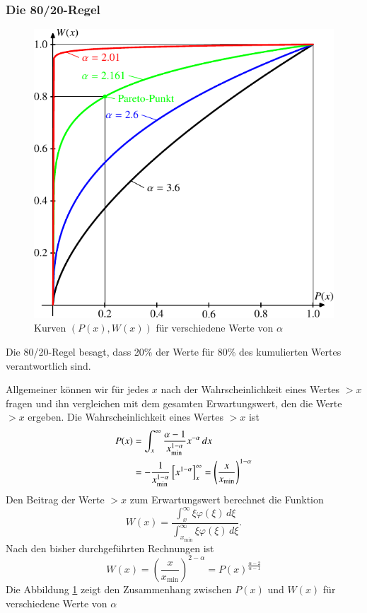 \subsubsection{Die 80/20-Regel}
\begin{figure}
\begin{center}
\includegraphics{images/power-4.pdf}
\end{center}
\caption{Kurven $(P(x),W(x))$ für verschiedene Werte von $\alpha$\label{wp}}
\end{figure}
Die 80/20-Regel besagt, dass 20\% der Werte für 80\% des kumulierten Wertes
verantwortlich sind.

Allgemeiner können wir für jedes $x$ nach der Wahrscheinlichkeit
eines Wertes $>x$ fragen und ihn vergleichen mit dem gesamten Erwartungswert,
den die Werte $>x$ ergeben.
Die Wahrscheinlichkeit eines Wertes $>x$ ist
\begin{align}
P(x)
&=
\int_x^\infty
\frac{\alpha-1}{x_{\min}^{1-\alpha}}
x^{-\alpha}
\,dx
\notag
\\
&=
-\frac{1}{x_{\min}^{1-\alpha}}
\left[x^{1-\alpha}\right]_x^\infty
=
\left(
\frac{x}{x_{\min}}
\right)^{1-\alpha}
\label{px}
\end{align}
Den Beitrag der Werte $>x$ zum Erwartungswert berechnet die Funktion
\begin{equation}
W(x)=\frac%
{\int_x^\infty \xi\varphi(\xi)\,d\xi}%
{\int_{x_{\min}}^\infty \xi\varphi(\xi)\,d\xi}.
\label{wx}
\end{equation}
Nach den bisher durchgeführten Rechnungen ist
\[
W(x)=\left(\frac{x}{x_{\min}}\right)^{2-\alpha}
=P(x)^{\frac{\alpha-2}{\alpha-1}}
\]
Die Abbildung \ref{wp} zeigt den Zusammenhang zwischen $P(x)$ und $W(x)$
für verschiedene Werte von $\alpha$

